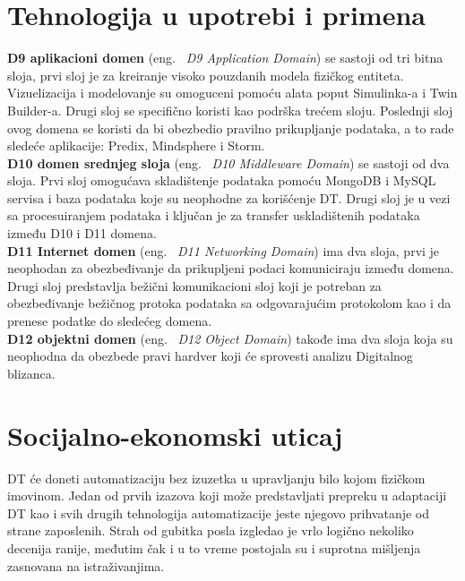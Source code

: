\documentclass[a4paper]{article}
\begin{document}
{\section{Tehnologija u upotrebi i primena}
\label{sec:upotreba}
\noindent

\textbf{D9 aplikacioni domen} (eng. ~{\em D9 Application Domain}) se sastoji od tri bitna sloja, prvi sloj je za kreiranje visoko pouzdanih
modela fizičkog entiteta. Vizuelizacija i modelovanje su omoguceni pomoću alata poput
Simulinka-a i Twin Builder-a. Drugi sloj se specifično koristi kao podrška trećem sloju.
Poslednji sloj ovog domena se koristi da bi obezbedio pravilno prikupljanje podataka, a to rade
sledeće aplikacije: Predix, Mindsphere i Storm. \cite{enablingtechnologies}\\

\textbf{D10 domen srednjeg sloja} (eng. ~{\em D10 Middleware Domain}) se sastoji od dva sloja. Prvi sloj omogućava skladištenje podataka
pomoću MongoDB i MySQL servisa i baza podataka koje su neophodne za korišćenje DT. Drugi sloj je u vezi sa procesuiranjem podataka i ključan je za transfer uskladištenih
podataka između D10 i D11 domena. \cite{enablingtechnologies}\\

\textbf{D11 Internet domen} (eng. ~{\em D11 Networking Domain}) ima dva sloja, prvi je neophodan za obezbeđivanje da prikupljeni podaci
komuniciraju između domena. Drugi sloj predstavlja bežični komunikacioni sloj koji je
potreban za obezbeđivanje bežičnog protoka podataka sa odgovarajućim protokolom kao i da
prenese podatke do sledećeg domena. \cite{enablingtechnologies}\\

\textbf{D12 objektni domen} (eng. ~{\em D12 Object Domain}) takođe ima dva sloja koja su neophodna da obezbede pravi hardver koji
će sprovesti analizu Digitalnog blizanca. \cite{enablingtechnologies}

\section{Socijalno-ekonomski uticaj}
\label{sec:socijalni_uticaj}

DT će doneti automatizaciju bez izuzetka u upravljanju bilo kojom fizičkom
imovinom. Jedan od prvih izazova koji može predstavljati prepreku u adaptaciji DT
kao i svih drugih tehnologija automatizacije jeste njegovo prihvatanje od strane zaposlenih.
Strah od gubitka posla izgledao je vrlo logično nekoliko decenija ranije, međutim čak i u to
vreme postojala su i suprotna mišljenja zasnovana na istraživanjima.\cite{values}

}
\end{document}
